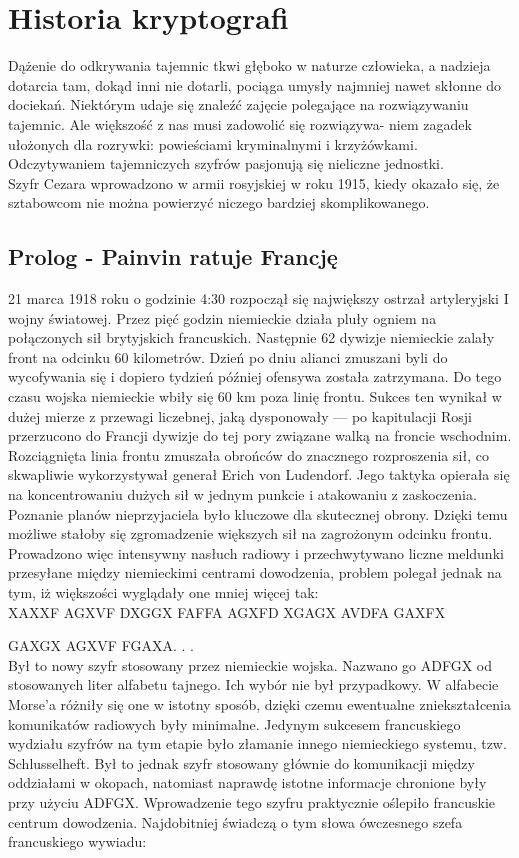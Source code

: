 \documentclass[a4paper]{article}
\begin{document}
\section{Historia kryptografi}
Dążenie do odkrywania tajemnic tkwi głęboko w naturze człowieka, a nadzieja dotarcia tam, dokąd
inni nie dotarli, pociąga umysły najmniej nawet skłonne do dociekań. Niektórym udaje się znaleźć
zajęcie polegające na rozwiązywaniu tajemnic. Ale większość z nas musi zadowolić się rozwiązywa-
niem zagadek ułożonych dla rozrywki: powieściami kryminalnymi i krzyżówkami. Odczytywaniem
tajemniczych szyfrów pasjonują się nieliczne jednostki.\\
Szyfr Cezara wprowadzono w armii rosyjskiej w roku 1915, kiedy okazało się, że sztabowcom nie
można powierzyć niczego bardziej skomplikowanego.

\subsection{Prolog - Painvin ratuje Francję}
21 marca 1918 roku o godzinie 4:30 rozpoczął się największy ostrzał artyleryjski I wojny światowej. Przez pięć godzin niemieckie działa pluły ogniem na połączonych sił brytyjskich  francuskich. Następnie 62 dywizje niemieckie zalały front na odcinku 60 kilometrów. Dzień po dniu alianci zmuszani byli do wycofywania się i dopiero tydzień później ofensywa została zatrzymana. Do tego czasu wojska niemieckie wbiły się 60 km poza linię frontu. Sukces ten wynikał w dużej mierze z przewagi liczebnej, jaką dysponowały — po kapitulacji Rosji przerzucono do Francji dywizje do tej pory związane walką na froncie wschodnim. Rozciągnięta linia frontu zmuszała obrońców do znacznego rozproszenia sił, co skwapliwie wykorzystywał generał Erich von Ludendorf. Jego taktyka opierała się na koncentrowaniu dużych sił w jednym punkcie i atakowaniu z zaskoczenia. Poznanie planów nieprzyjaciela było kluczowe dla skutecznej obrony. Dzięki temu możliwe stałoby się zgromadzenie większych sił na zagrożonym odcinku frontu. Prowadzono więc intensywny nasłuch radiowy i przechwytywano liczne meldunki przesyłane między niemieckimi centrami dowodzenia, problem polegał jednak na tym, iż większości wyglądały one mniej więcej tak:\\

XAXXF AGXVF DXGGX FAFFA AGXFD XGAGX AVDFA GAXFX

GAXGX AGXVF FGAXA. . .\\

\noindent Był to nowy szyfr stosowany przez niemieckie wojska. Nazwano go ADFGX od stosowanych liter
alfabetu tajnego. Ich wybór nie był przypadkowy. W alfabecie Morse’a różniły się one w istotny sposób, dzięki czemu ewentualne zniekształcenia komunikatów radiowych były minimalne. Jedynym
sukcesem francuskiego wydziału szyfrów na tym etapie było złamanie innego niemieckiego systemu, tzw. Schlusselheft. Był to jednak szyfr stosowany głównie do komunikacji między oddziałami
w okopach, natomiast naprawdę istotne informacje chronione były przy użyciu ADFGX. Wprowadzenie tego szyfru praktycznie oślepiło francuskie centrum dowodzenia. Najdobitniej świadczą o
tym słowa ówczesnego szefa francuskiego wywiadu:\\
\end{document}
